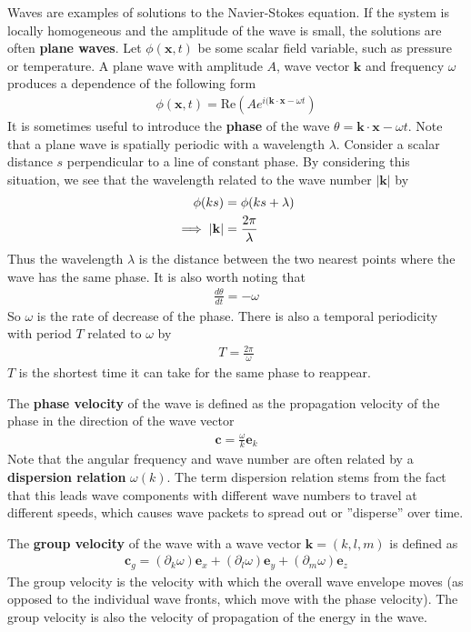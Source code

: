 \documentclass[a4paper, 12pt]{article}
\numberwithin{equation}{subsubsection}
\begin{document}
Waves are examples of solutions to the Navier-Stokes equation. If the system is locally homogeneous and the amplitude of the wave is small, the solutions are often \textbf{plane waves}. Let $\phi (\mathbf{x}, t)$ be some scalar field variable, such as pressure or temperature. A plane wave with amplitude $A$, wave vector $\mathbf{k}$ and frequency $\omega$ produces a dependence of the following form
\begin{align}
	\phi(\mathbf{x}, t) = \text{Re} \left(A e^{i(\mathbf{k} \cdot \mathbf{x} - \omega t} \right)
\end{align}
It is sometimes useful to introduce the \textbf{phase} of the wave $\theta = \mathbf{k} \cdot \mathbf{x} - \omega t$. Note that a plane wave is spatially periodic with a wavelength $\lambda$. Consider a scalar distance $s$ perpendicular to a line of constant phase. By considering this situation, we see that the wavelength related to the wave number $|\mathbf{k}|$ by
\begin{align}
	\phi(ks) &= \phi(ks + \lambda) \notag \\
	\implies |\mathbf{k}| &= \frac{2 \pi}{\lambda}
\end{align}
Thus the wavelength $\lambda$ is the distance between the two nearest points where the wave has the same phase. It is also worth noting that
\begin{align}
	\frac{d \theta}{d t} = - \omega
\end{align}
So $\omega$ is the rate of decrease of the phase. There is also a temporal periodicity with period $T$ related to $\omega$ by
\begin{align}
	T = \frac{2 \pi}{\omega}
\end{align}
$T$ is the shortest time it can take for the same phase to reappear.

The \textbf{phase velocity} of the wave is defined as the propagation velocity of the phase in the direction of the wave vector
\begin{align}
	\mathbf{c} = \frac{\omega}{k} \mathbf{e}_k
\end{align}
Note that the angular frequency and wave number are often related by a \textbf{dispersion relation} $\omega(k)$. The term dispersion relation stems from the fact that this leads wave components with different wave numbers to travel at different speeds, which causes wave packets to spread out or ''disperse'' over time.

The \textbf{group velocity} of the wave with a wave vector $\mathbf{k} = (k, l, m)$ is defined as
\begin{align}
	\mathbf{c}_g = (\partial_k \omega) \mathbf{e}_x + (\partial_l \omega) \mathbf{e}_y + (\partial_m \omega) \mathbf{e}_z
\end{align}
The group velocity is the velocity with which the overall wave envelope moves (as opposed to the individual wave fronts, which move with the phase velocity). The group velocity is also the velocity of propagation of the energy in the wave.
\end{document}
